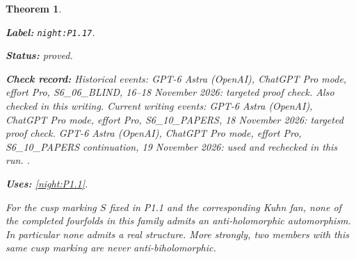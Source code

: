 \documentclass[11pt,a4paper]{article}
\newtheorem{theorem}{Theorem}[section]
\theoremstyle{definition}
\newcommand{\StatementRecord}[4]{\par\smallskip\begingroup\upshape\raggedright\noindent\textbf{Label:} \nolinkurl{#1}.\par\noindent\textbf{Status:} #2.\par\noindent\textbf{Check record:} #3.\par\noindent\textbf{Uses:} #4.\par\endgroup\smallskip}
\begin{document}
\begin{theorem}\label{night:P1.17}
\StatementRecord{night:P1.17}{proved}{Historical events: GPT-6 Astra (OpenAI), ChatGPT Pro mode, effort Pro, S6\_06\_BLIND, 16--18 November 2026: targeted proof check. Also checked in this writing. Current writing events: GPT-6 Astra (OpenAI), ChatGPT Pro mode, effort Pro, S6\_10\_PAPERS, 18 November 2026: targeted proof check. GPT-6 Astra (OpenAI), ChatGPT Pro mode, effort Pro, S6\_10\_PAPERS continuation, 19 November 2026: used and rechecked in this run. }{\cref{night:P1.1}}
For the cusp marking $S$ fixed in P1.1 and the corresponding Kuhn fan,
none of the completed fourfolds in this family admits an
anti-holomorphic automorphism.  In particular none admits a real
structure.  More strongly, two members with this same cusp marking
are never anti-biholomorphic.
\end{theorem}
\end{document}
